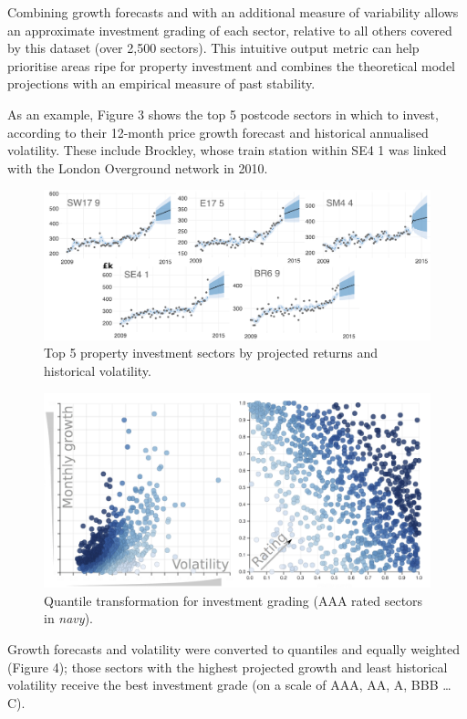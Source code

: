 \documentclass[
10pt, %
a4paper, %
oneside, %
headinclude,footinclude, %
BCOR5mm, %
]{scrartcl}
\begin{document}
Combining growth forecasts and with an additional measure of
variability allows an approximate investment grading of each sector,
relative to all others covered by this dataset (over 2,500
sectors). This intuitive output metric can help prioritise areas ripe
for property investment and combines the theoretical model projections
with an empirical measure of past stability.

As an example, Figure 3 shows the top 5 postcode sectors in which to
invest, according to their 12-month price growth forecast and
historical annualised volatility. These include Brockley,
whose train station within SE4 1 was linked with the London Overground network in 2010.\\

\begin{figure}[h]
\begin{center}
\includegraphics[width=.9\textwidth]{Figures/t5.pdf}
\caption{Top 5 property investment sectors by projected returns and historical volatility.}
\end{center}
\end{figure}

\setlength{\intextsep}{0em}
\begin{figure}
\vspace{.5em}
\centering
\includegraphics[width=.44\textwidth]{inkscape/grading_2.png}
\vspace{-1em}
\caption{ Quantile transformation for investment grading
  (AAA rated sectors in \emph{navy}).}
\vspace{.5em}
\end{figure}

Growth forecasts and volatility were converted to quantiles and
equally weighted (Figure 4); those sectors with the highest projected growth
and least historical volatility receive the best investment grade
(on a scale of AAA, AA, A, BBB \ldots C).
\end{document}
